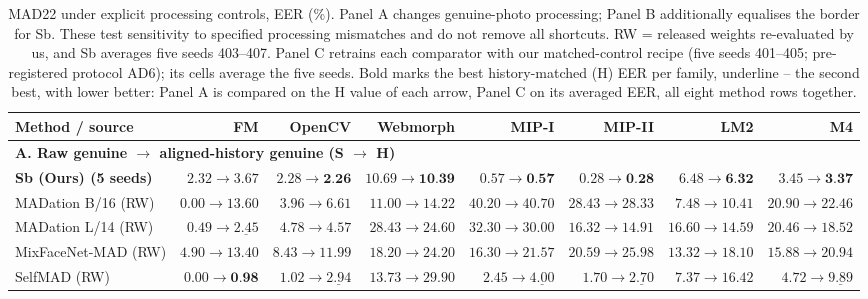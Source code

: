     \begin{table}[t]
    \centering\small
    \setlength{\tabcolsep}{2.4pt}
    \caption{MAD22 under explicit processing controls, EER (\%). 
    Panel A changes genuine-photo processing; Panel B additionally equalises the border for Sb. These test sensitivity to specified processing mismatches and do not remove all shortcuts. 
    RW = released weights re-evaluated by us, and Sb averages five seeds 403--407.
    Panel C retrains each comparator with our matched-control recipe (five seeds 401--405; pre-registered protocol AD6); its cells average the five seeds.
    Bold marks the best history-matched (H) EER per family, underline -- the second best, with lower better: Panel A is compared on the H value of each arrow, Panel C on its averaged EER, all eight method rows together.
    }
    \label{tab:mad22_results}
    \begin{tabular}{lrrrrrrr}
    \toprule
    Method / source & FM & OpenCV & Webmorph & MIP-I & MIP-II & LM2 & M4 \\
    \midrule
    \multicolumn{8}{l}{\textbf{A. Raw genuine $\rightarrow$ aligned-history genuine (S $\rightarrow$ H)}} \\
\textbf{    Sb (Ours) (5 seeds)} & $2.32\!\to\!3.67$ & $2.28\!\to\!\textbf{2.26}$ & $10.69\!\to\!\textbf{10.39}$ & $0.57\!\to\!\textbf{0.57}$ & $0.28\!\to\!\textbf{0.28}$ & $6.48\!\to\!\textbf{6.32}$ & $3.45\!\to\!\textbf{3.37}$ \\
    MADation B/16 (RW) & $0.00\!\to\!13.60$ & $3.96\!\to\!6.61$ & $11.00\!\to\!14.22$ & $40.20\!\to\!40.70$ & $28.43\!\to\!28.33$ & $7.48\!\to\!10.41$ & $20.90\!\to\!22.46$ \\
    MADation L/14 (RW) & $0.49\!\to\!\underline{2.45}$ & $4.78\!\to\!4.57$ & $28.43\!\to\!24.60$ & $32.30\!\to\!30.00$ & $16.32\!\to\!14.91$ & $16.60\!\to\!14.59$ & $20.46\!\to\!18.52$ \\
    MixFaceNet-MAD (RW) & $4.90\!\to\!13.40$ & $8.43\!\to\!11.99$ & $18.20\!\to\!24.20$ & $16.30\!\to\!21.57$ & $20.59\!\to\!25.98$ & $13.32\!\to\!18.10$ & $15.88\!\to\!20.94$ \\
    SelfMAD (RW) & $0.00\!\to\!\textbf{0.98}$ & $1.02\!\to\!\underline{2.94}$ & $13.73\!\to\!29.90$ & $2.45\!\to\!\underline{4.00}$ & $1.70\!\to\!\underline{2.70}$ & $7.37\!\to\!16.42$ & $4.72\!\to\!\underline{9.89}$ \\

\end{tabular}
\end{table}
